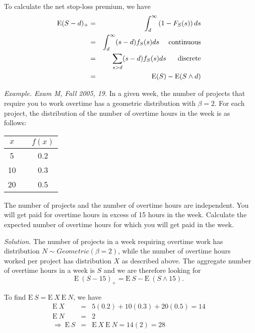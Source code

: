 \documentclass[12pt,letterpaper]{article}
\begin{document}
To calculate the net stop-loss premium, we have
\begin{eqnarray*}
\mathrm{E}(S-d)_+  & =& \int_{d}^{\infty} \left(1-F_S(s) \right) ds\\
&=& \int_{d}^{\infty}(s-d) f_{S}(s) ds ~~~~{\rm continuous}\\
&=& \sum_{s>d}(s-d) f_{S}(s) ds  ~~~~~{\rm discrete}\\
&=& \mathrm{E}(S) - \mathrm{E}(S\wedge d)\\
\end{eqnarray*}




\noindent \textit{Example. Exam M, Fall 2005, 19.} In a given week, the number of projects that require you to work overtime has a geometric distribution with $\beta=2$. For each project, the distribution of the number of overtime hours in the week is as follows:

\bigskip

\begin{center}
\begin{tabular}{c c c } \hline
    $x$ &  & $f(x)$\\ \hline
    5 &  & 0.2 \\
    10 & & 0.3 \\
    20 & & 0.5\\ \hline
  \end{tabular}
\end{center}
\bigskip
The number of projects and the number of overtime hours are independent. You will get paid for overtime hours in excess of 15 hours in the week. Calculate the expected number of overtime hours for which you will get paid in the week.
\bigskip

\noindent \textit{Solution.} The number of projects in a week requiring overtime work has distribution $N \sim Geometric(\beta=2)$, while the number of overtime hours worked per project has distribution $X$ as described above. The aggregate number of overtime hours in a week is $S$ and we are therefore looking for
$$\mathrm{E~}(S-15)_+ = \mathrm{E~}S - \mathrm{E~}(S \wedge 15).$$

To find $\mathrm{E~}S = \mathrm{E~}X \ \mathrm{E~}N$, we have
\begin{eqnarray*}
\mathrm{E~}X &=& 5(0.2) + 10(0.3)+ 20(0.5)= 14 \\
\mathrm{E~}N &=& 2 \\
\Rightarrow \ \mathrm{E~}S &=& \mathrm{E~}X \ \mathrm{E~}N = 14(2) = 28
\end{eqnarray*}
\end{document}
